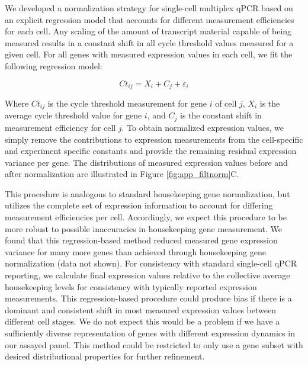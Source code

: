 \begin{subappendices}
We developed a normalization strategy for single-cell multiplex qPCR based on an explicit regression model that accounts for different measurement efficiencies for each cell. Any scaling of the amount of transcript material capable of being measured results in a constant shift in all cycle threshold values measured for a given cell. For all genes with measured expression values in each cell, we fit the following regression model:

\begin{equation}
	Ct_{ij} = X_i + C_j + \varepsilon_i
\end{equation}

Where $Ct_{ij}$ is the cycle threshold measurement for gene $i$ of cell $j$, $X_i$ is the average cycle threshold value for gene $i$, and $C_j$ is the constant shift in measurement efficiency for cell $j$. To obtain normalized expression values, we simply remove the contributions to expression measurements from the cell-specific and experiment specific constants and provide the remaining residual expression variance per gene. The distributions of measured expression values before and after normalization are illustrated in Figure \ref{fig:app_filtnorm}C. 

This procedure is analogous to standard housekeeping gene normalization, but utilizes the complete set of expression information to account for differing measurement efficiencies per cell. Accordingly, we expect this procedure to be more robust to possible inaccuracies in housekeeping gene measurement. We found that this regression-based method reduced measured gene expression variance for many more genes than achieved through housekeeping gene normalization (data not shown). For consistency with standard single-cell qPCR reporting, we calculate final expression values relative to the collective average housekeeping levels for consistency with typically reported expression measurements. This regression-based procedure could produce bias if there is a dominant and consistent shift in most measured expression values between different cell stages. We do not expect this would be a problem if we have a sufficiently diverse representation of genes with different expression dynamics in our assayed panel. This method could be restricted to only use a gene subset with desired distributional properties for further refinement. 


\end{subappendices}
